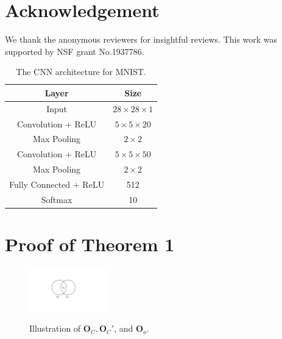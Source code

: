 \documentclass[letterpaper]{article} %
\begin{document}
\section*{Acknowledgement}
We thank the anonymous reviewers for insightful reviews. This work was supported by NSF grant No.1937786.




\onecolumn
\appendix

\newpage 

\begin{table}[!h]
\centering
\begin{tabular}{|c|c|} \hline 
{Layer} & {Size} \\ \hline
{Input} & { $28\times28\times1$}\\ \hline
{Convolution + ReLU} & { $5\times5\times20$}\\ \hline
{Max Pooling} & { $2\times2$}\\ \hline
{Convolution + ReLU} & { $5\times5\times50$}\\ \hline
{Max Pooling} & { $2\times2$}\\ \hline
{Fully Connected + ReLU} & {512}\\ \hline
{Softmax} & {10}\\ \hline
\end{tabular}
\caption{The CNN architecture for MNIST.}
\label{tab:cnn}
\end{table}

\section{Proof of Theorem 1}
\label{proof_of_certified_radius}

\begin{figure}[!h]
    \center
    {\includegraphics[width=0.3\textwidth]{./figs/proof1.pdf}}
    \caption{Illustration of $\mathbf{O}_C,\mathbf{O}_C'$, and $\mathbf{O}_o$.}
    \label{fig:proof1}
\end{figure}
\end{document}
